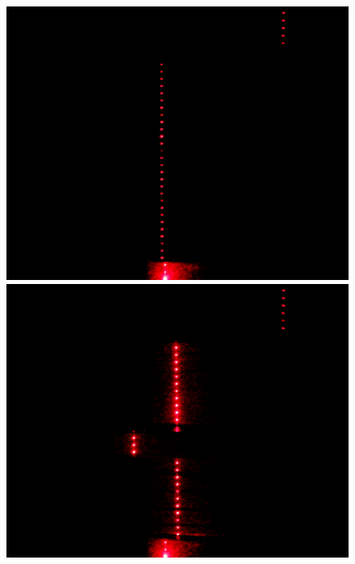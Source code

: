 \begin{figure}[ht!]
	\begin{minipage}[t]{0.3\textwidth}
		\centering
		\includegraphics[width=1\textwidth]{figures/ImageAnalysis/Crop/cross2_base.png}
	\end{minipage}
	\hspace{0.02\textwidth}
	\begin{minipage}[t]{0.3\textwidth}
		\centering
		\includegraphics[width=1\textwidth]{figures/ImageAnalysis/Crop/cross2_glare.png}
	\end{minipage}
	\hspace{0.02\textwidth}
	\begin{minipage}[t]{0.3\textwidth}

\end{minipage}
\end{figure}
